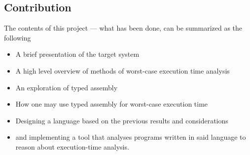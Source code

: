 \subsection{Contribution} %
The contents of this project --- what has been done, can be summarized as the following
\begin{itemize}
    \item
        A brief presentation of the target system
    \item
        A high level overview of methods of worst-case execution time analysis
    \item
        An exploration of typed assembly
    \item
        How one may use typed assembly for worst-case execution time
    \item
        Designing a language based on the previous results and considerations
    \item
        and implementing a tool that analyses programs written in said language
        to reason about execution-time analysis.

\end{itemize}
